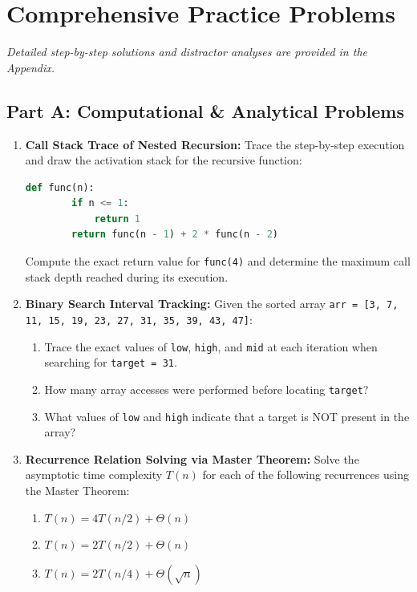 \newpage
\section{Comprehensive Practice Problems}
\textit{Detailed step-by-step solutions and distractor analyses are provided in the Appendix.}

\subsection*{Part A: Computational \& Analytical Problems}

\begin{enumerate}
    \item \textbf{Call Stack Trace of Nested Recursion:}
    Trace the step-by-step execution and draw the activation stack for the recursive function:
    \begin{lstlisting}[language=Python]
    def func(n):
        if n <= 1:
            return 1
        return func(n - 1) + 2 * func(n - 2)
    \end{lstlisting}
    Compute the exact return value for \texttt{func(4)} and determine the maximum call stack depth reached during its execution.

    \item \textbf{Binary Search Interval Tracking:}
    Given the sorted array \texttt{arr = [3, 7, 11, 15, 19, 23, 27, 31, 35, 39, 43, 47]}:
    \begin{enumerate}
        \item Trace the exact values of \texttt{low}, \texttt{high}, and \texttt{mid} at each iteration when searching for \texttt{target = 31}.
        \item How many array accesses were performed before locating \texttt{target}?
        \item What values of \texttt{low} and \texttt{high} indicate that a target is NOT present in the array?
    \end{enumerate}

    \item \textbf{Recurrence Relation Solving via Master Theorem:}
    Solve the asymptotic time complexity $T(n)$ for each of the following recurrences using the Master Theorem:
    \begin{enumerate}
        \item $T(n) = 4 T(n/2) + \Theta(n)$
        \item $T(n) = 2 T(n/2) + \Theta(n)$
        \item $T(n) = 2 T(n/4) + \Theta(\sqrt{n})$
    \end{enumerate}


\end{enumerate}
